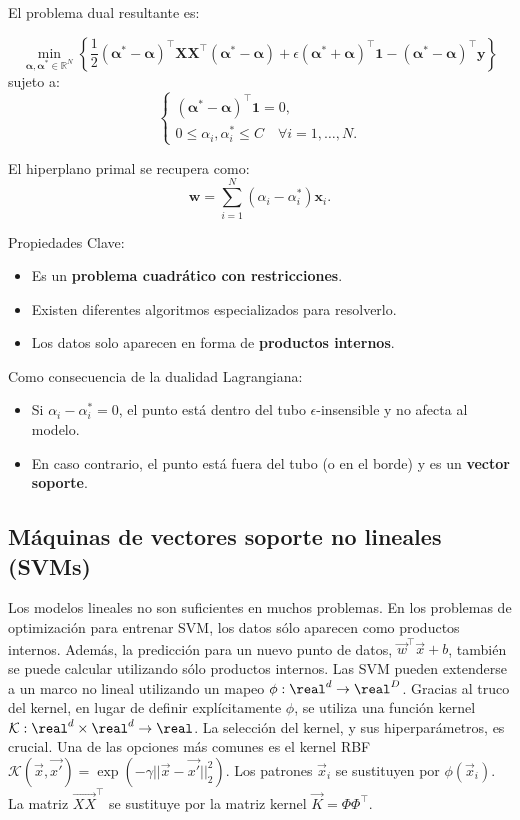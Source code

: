 El problema dual resultante es:

$$\min_{\boldsymbol{\alpha}, \boldsymbol{\alpha}^* \in \mathbb{R}^N} 
\left\{ 
\frac{1}{2} (\boldsymbol{\alpha}^* - \boldsymbol{\alpha})^\top \mathbf{X}\mathbf{X}^\top (\boldsymbol{\alpha}^* - \boldsymbol{\alpha}) 
+ \epsilon (\boldsymbol{\alpha}^* + \boldsymbol{\alpha})^\top \mathbf{1} 
- (\boldsymbol{\alpha}^* - \boldsymbol{\alpha})^\top \mathbf{y} 
\right\}
$$
sujeto a:
$$
\begin{cases}
(\boldsymbol{\alpha}^* - \boldsymbol{\alpha})^\top \mathbf{1} = 0, \\
0 \leq \alpha_i, \alpha_i^* \leq C \quad \forall i = 1,\ldots,N.
\end{cases}$$

El hiperplano primal se recupera como:
$$\mathbf{w} = \sum_{i=1}^{N} (\alpha_i - \alpha_i^*) \mathbf{x}_i.$$

Propiedades Clave:
\begin{itemize}
    \item Es un \textbf{problema cuadrático con restricciones}.
    \item Existen diferentes algoritmos especializados para resolverlo.
    \item Los datos solo aparecen en forma de \textbf{productos internos}.
\end{itemize}

Como consecuencia de la dualidad Lagrangiana:
\begin{itemize}
    \item Si $\alpha_i - \alpha_i^* = 0$, el punto está dentro del tubo $\epsilon$-insensible y no afecta al modelo.
    \item En caso contrario, el punto está fuera del tubo (o en el borde) y es un \textbf{vector soporte}.
\end{itemize}

\subsection{Máquinas de vectores soporte no lineales (SVMs)}
Los modelos lineales no son suficientes en muchos problemas. En los problemas de optimización para entrenar SVM, los datos sólo aparecen como productos internos. Además, la predicción para un nuevo punto de datos, $\vec{w}^\intercal \vec{x} + b$, también se puede calcular utilizando sólo productos internos. Las SVM pueden extenderse a un marco no lineal utilizando un mapeo $\phi: \real^d \rightarrow \real^D$. Gracias al truco del kernel, en lugar de definir explícitamente $\phi$, se utiliza una función kernel $\mathcal{K}: \real^d \times \real^d \rightarrow \real$. La selección del kernel, y sus hiperparámetros, es crucial. Una de las opciones más comunes es el kernel RBF $\mathcal{K}(\vec{x}, \vec{x'}) = \exp(-\gamma ||\vec{x} - \vec{x'}||_2^2)$. Los patrones $\vec{x}_i$ se sustituyen por $\phi (\vec{x}_i)$. La matriz $\vec{XX}^\intercal$ se sustituye por la matriz kernel $\vec{K} = \Phi \Phi^\intercal$.